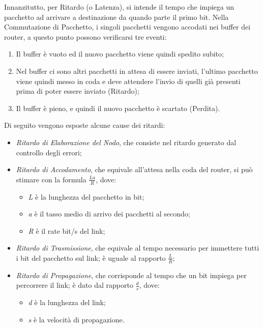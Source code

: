 \documentclass[a4paper]{article}
\begin{document}
			Innanzitutto, per Ritardo (o Latenza), si intende il tempo che impiega un pacchetto ad arrivare a destinazione da quando parte il primo bit.
			Nella Commutazione di Pacchetto, i singoli pacchetti vengono accodati nei buffer dei router, a questo punto possono verificarsi tre eventi:
			\begin{enumerate}
				\item Il buffer è vuoto ed il nuovo pacchetto viene quindi spedito subito;
				\item Nel buffer ci sono altri pacchetti in attesa di essere inviati, l'ultimo pacchetto viene quindi messo in coda e deve attendere l'invio di quelli già presenti prima di poter essere inviato (Ritardo);
				\item Il buffer è pieno, e quindi il nuovo pacchetto è scartato (Perdita).
			\end{enumerate}
			
			Di seguito vengono esposte alcune cause dei ritardi:
			\begin{itemize}
				\item \emph{Ritardo di Elaborazione del Nodo}, che consiste nel ritardo generato dal controllo degli errori;
				\item \emph{Ritardo di Accodamento}, che equivale all'attesa nella coda del router, si può stimare con la formula
					  								 \( \frac{La}{R} \), dove:
					\begin{itemize}
						\item \emph{L} è la lunghezza del pacchetto in bit;
						\item \emph{a} è il tasso medio di arrivo dei pacchetti al secondo;
						\item \emph{R} è il rate bit/s del link;
					\end{itemize}
				\item \emph{Ritardo di Trasmissione}, che equivale al tempo necessario per immettere tutti i bit del pacchetto sul link; è uguale al  rapporto \( \frac{L}{R} \);
				\item \emph{Ritardo di Propagazione}, che corrisponde al tempo che un bit impiega per percorrere il link; è dato dal rapporto \( \frac{d}{s} \), dove:
					\begin{itemize}
						\item \emph{d} è la lunghezza del link;
						\item \emph{s} è la velocità di propagazione.
					\end{itemize}
			\end{itemize}
\end{document}
